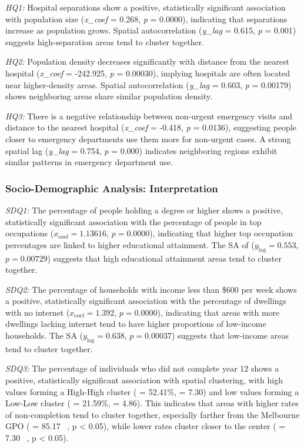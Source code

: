 \documentclass[
	a4paper, %
	10pt, %
	unnumberedsections, %
	twoside, %
]{LTJournalArticle}
\begin{document}
\textit{HQ1:} Hospital separations show a positive, statistically significant association with population size (\textit{x\_coef} = 0.268, \textit{p} = 0.0000), indicating that separations increase as population grows. Spatial autocorrelation (\textit{y\_lag} = 0.615, \textit{p} = 0.001) suggests high-separation areas tend to cluster together.

\textit{HQ2:} Population density decreases significantly with distance from the nearest hospital (\textit{x\_coef} = -242.925, \textit{p} = 0.00030), implying hospitals are often located near higher-density areas. Spatial autocorrelation (\textit{y\_lag} = 0.603, \textit{p} = 0.00179) shows neighboring areas share similar population density.

\textit{HQ3:} There is a negative relationship between non-urgent emergency visits and distance to the nearest hospital (\textit{x\_coef} = -0.418, \textit{p} = 0.0136), suggesting people closer to emergency departments use them more for non-urgent cases. A strong spatial lag (\textit{y\_lag} = 0.754, \textit{p} = 0.000) indicates neighboring regions exhibit similar patterns in emergency department use.


\subsubsection{Socio-Demographic Analysis: Interpretation}\leavevmode

\textit{SDQ1:} The percentage of people holding a degree or higher shows a positive, statistically significant association with the percentage of people in top occupations ($x_{\text{coef}} = 1.13616$, $p = 0.0000$), indicating that higher top occupation percentages are linked to higher educational attainment. The SA of ($y_{\text{lag}} = 0.553$, $p = 0.00729$) suggests that high educational attainment areas tend to cluster together.

\textit{SDQ2:} The percentage of households with income less than \$600 per week shows a positive, statistically significant association with the percentage of dwellings with no internet ($x_{\text{coef}} = 1.392$, $p = 0.0000$), indicating that areas with more dwellings lacking internet tend to have higher proportions of low-income households. The SA ($y_{\text{lag}} = 0.638$, $p = 0.00037$) suggests that low-income areas tend to cluster together.

\textit{SDQ3:} The percentage of individuals who did not complete year 12 shows a positive, statistically significant association with spatial clustering, with high values forming a High-High cluster ( = 52.41\%,  = 7.30) and low values forming a Low-Low cluster ( = 21.59\%,  = 4.86). This indicates that areas with higher rates of non-completion tend to cluster together, especially farther from the Melbourne GPO ( = 85.17 \ , p < 0.05), while lower rates cluster closer to the center ( = 7.30 \ , p < 0.05).
\end{document}
